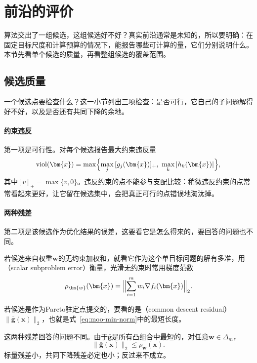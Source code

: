 \section{前沿的评价}
\label{sec:moo-front-evaluation}

算法交出了一组候选，这组候选好不好？真实前沿通常是未知的，所以要明确：在固定目标尺度和计算预算的情况下，能报告哪些可计算的量，它们分别说明什么。本节先看单个候选的质量，再看整组候选的覆盖范围。

\subsection{候选质量}
\label{sec:moo-candidate-quality}

一个候选点要检查什么？这一小节列出三项检查：是否可行，它自己的子问题解得好不好，以及是否还有共同下降的余地。

\paragraph{约束违反}
第一项是可行性。对每个候选报告最大约束违反量
\begin{equation}
 \mathrm{viol}(\bm{x})=\max\Bigl\{\max_j\,[g_j(\bm{x})]_+,\ \max_k\,\lvert h_k(\bm{x})\rvert\Bigr\},
 \label{eq:moo-violation}
\end{equation}
其中$[v]_+=\max\{v,0\}$。违反约束的点不能参与支配比较：稍微违反约束的点常常看起来更好，让它留在候选集中，会把真正可行的点错误地淘汰掉。

\paragraph{两种残差}
第二项是该候选作为优化结果的误差，这要看它是怎么得来的，要回答的问题也不同。

若候选来自权重$\bm{w}$的无约束加权和，就看它作为这个单目标问题的解有多准，用（scalar subproblem error）衡量，光滑无约束时常用梯度范数
\begin{equation}
 \rho_{\bm{w}}(\bm{x})=\Bigl\lVert\sum_{i=1}^mw_i\nabla f_i(\bm{x})\Bigr\rVert_2.
 \label{eq:moo-scalar-residual}
\end{equation}

若候选是作为Pareto驻定点提交的，要看的是（common descent residual）$\lVert\bar{\bm{g}}(\bm{x})\rVert_2$，也就是式~\eqref{eq:moo-min-norm}中的最短长度。

这两种残差回答的问题不同。由于$\bar{\bm{g}}$是所有凸组合中最短的，对任意$\bm{w}\in\Delta_m$，
\begin{equation}
 \lVert\bar{\bm{g}}(\bm{x})\rVert_2\leq\rho_{\bm{w}}(\bm{x}).
 \label{eq:moo-residual-order}
\end{equation}
标量残差小，共同下降残差必定也小；反过来不成立。

